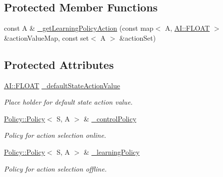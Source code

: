 \subsection*{Protected Member Functions}
\begin{DoxyCompactItemize}
\item 
const A \& \hyperlink{classAI_1_1Algorithm_1_1LearningAlgorithm_ad5b5f6baa9c03f68427008abeeb35535}{\+\_\+get\+Learning\+Policy\+Action} (const map$<$ A, \hyperlink{namespaceAI_a41b74884a20833db653dded3918e05c3}{A\+I\+::\+F\+L\+O\+A\+T} $>$ \&action\+Value\+Map, const set$<$ A $>$ \&action\+Set)
\end{DoxyCompactItemize}
\subsection*{Protected Attributes}
\begin{DoxyCompactItemize}
\item 
\hypertarget{classAI_1_1Algorithm_1_1LearningAlgorithm_ae3b8ccdc51ad2a8c1cc2ef9009258466}{\hyperlink{namespaceAI_a41b74884a20833db653dded3918e05c3}{A\+I\+::\+F\+L\+O\+A\+T} \hyperlink{classAI_1_1Algorithm_1_1LearningAlgorithm_ae3b8ccdc51ad2a8c1cc2ef9009258466}{\+\_\+default\+State\+Action\+Value}}\label{classAI_1_1Algorithm_1_1LearningAlgorithm_ae3b8ccdc51ad2a8c1cc2ef9009258466}

\begin{DoxyCompactList}\small\item\em Place holder for default state action value. \end{DoxyCompactList}\item 
\hypertarget{classAI_1_1Algorithm_1_1LearningAlgorithm_ad74dbed6a7be0c699d42642b9968bf86}{\hyperlink{classAI_1_1Algorithm_1_1Policy_1_1Policy}{Policy\+::\+Policy}$<$ S, A $>$ \& \hyperlink{classAI_1_1Algorithm_1_1LearningAlgorithm_ad74dbed6a7be0c699d42642b9968bf86}{\+\_\+control\+Policy}}\label{classAI_1_1Algorithm_1_1LearningAlgorithm_ad74dbed6a7be0c699d42642b9968bf86}

\begin{DoxyCompactList}\small\item\em Policy for action selection online. \end{DoxyCompactList}\item 
\hypertarget{classAI_1_1Algorithm_1_1LearningAlgorithm_a603f2a2905636a150c0fb9946085837a}{\hyperlink{classAI_1_1Algorithm_1_1Policy_1_1Policy}{Policy\+::\+Policy}$<$ S, A $>$ \& \hyperlink{classAI_1_1Algorithm_1_1LearningAlgorithm_a603f2a2905636a150c0fb9946085837a}{\+\_\+learning\+Policy}}\label{classAI_1_1Algorithm_1_1LearningAlgorithm_a603f2a2905636a150c0fb9946085837a}

\begin{DoxyCompactList}\small\item\em Policy for action selection offline. \end{DoxyCompactList}\end{DoxyCompactItemize}
